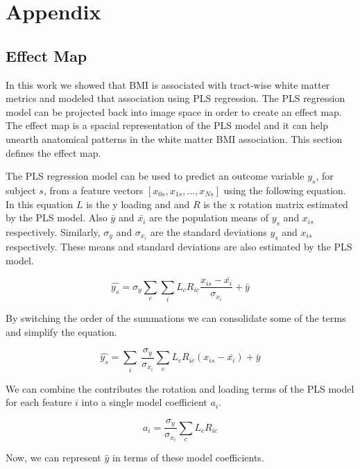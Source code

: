 \section{Appendix}
\subsection{Effect Map}
    In this work we showed that BMI is associated with tract-wise white matter metrics and modeled that association using PLS regression. The PLS regression model can be projected back into image space in order to create an effect map. The effect map is a spacial representation of the PLS model and it can help unearth anatomical patterns in the white matter BMI association. This section defines the effect map.

    The PLS regression model can be used to predict an outcome variable $y_s$, for subject $s$, from a feature vectors $[x_{0s}, x_{1s}, ..., x_{Ns}]$ using the following equation. In this equation $L$ is the y loading and and $R$ is the x rotation matrix estimated by the PLS model. Also $\bar{y}$ and $\bar{x_i}$ are the population means of $y_s$ and $x_{is}$ respectively. Similarly, $\sigma_{y}$ and $\sigma_{x_i}$ are the standard deviations $y_s$ and $x_{is}$ respectively. These means and standard deviations are also estimated by the PLS model.
    
\begin{equation} \label{eqn:PlsEqn}
\hat{y_s} = \displaystyle\sigma_y\sum_c\sum_i{L_c R_{ic} \frac{x_{is} - \bar{x_i}}{\sigma_{x_i}}} + \bar{y}
\end{equation}

By switching the order of the summations we can consolidate some of the terms and simplify the equation.

\begin{equation}
\hat{y_s} = \displaystyle\sum_i\ \frac{\sigma_y}{\sigma_{x_i}} \sum_c{ L_c R_{ic} (x_{is} - \bar{x_i})} + \bar{y}
\end{equation}

We can combine the contributes the rotation and loading terms of the PLS model for each feature $i$ into a single model coefficient $a_i$.

\begin{equation}
a_i = \displaystyle\frac{\sigma_y}{\sigma_{x_i}} \sum_c{ L_c R_{ic}}
\end{equation}

Now, we can represent $\hat{y}$ in terms of these model coefficients.


